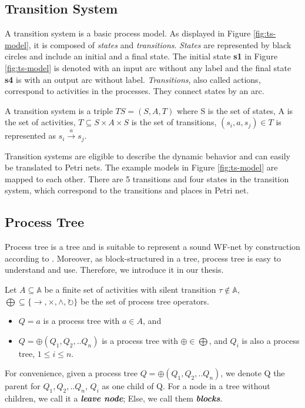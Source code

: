 \subsection{Transition System}
A transition system is a basic process model. As displayed in Figure \ref{fig:ts-model}, it is composed of \emph{states} and \emph{transitions}. \emph{States} are represented by black circles and include an initial and a final state. The initial state \textbf{s1} in Figure \ref{fig:ts-model} is denoted with an input arc without any label and the final state \textbf{s4} is with an output arc without label. \emph{Transitions}, also called actions, correspond to activities in the processes. They connect states by an arc.  
\begin{definition}
	A transition system is a triple $TS=(S,A,T)$ where S is the set of states, A is the set of activities, $T \subseteq S\times A\times S $ is the set of transitions, $(s_i, a, s_j) \in T$ is represented as $s_i \xrightarrow{a} s_j$.  
\end{definition}
Transition systems are eligible to describe the dynamic behavior and can easily be translated to Petri nets. The example models in Figure \ref{fig:ts-model} are mapped to each other. There are 5 transitions and four states in the transition system, which correspond to the transitions and places in Petri net. %
\subsection{Process Tree}
Process tree is a tree and is suitable to represent a sound WF-net  by construction according to \cite{van2016data}. Moreover, as block-structured in a tree, process tree is easy to understand and use. Therefore, we introduce it in our thesis.
\begin{definition}
Let $ A \subseteq \mathbb{A} $ be a finite set of activities with silent transition $\tau \notin \mathbb{A}$, $\bigoplus \subseteq \{\rightarrow, \times, \land, \circlearrowright\}$ be the set of process tree operators. 
\begin{itemize}
\item $Q=a$ is a process tree with $a\in A$, and 
\item $Q= \oplus (Q_1 , Q_2 ,.. Q_n)$ is a process tree with $\oplus \in \bigoplus$, and $Q_i$ is also a process tree, $ 1 \leq i \leq n$. 
\end{itemize}
\end{definition}
For convenience, given a process tree $Q= \oplus (Q_1 , Q_2 ,.. Q_n)$, we denote Q the parent for $Q_1 , Q_2 ,.. Q_n$, $Q_i$ as one child of Q. For a node in a tree without children, we call it a \textbf{\emph{leave node}}; Else, we call them \textbf{\emph{blocks}}.


